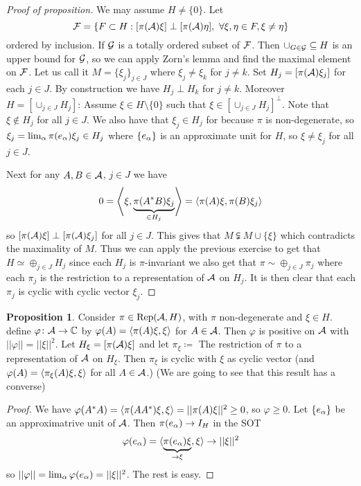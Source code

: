\documentclass[10pt,english,a4paper]{article}
\theoremstyle{definition}
\newtheorem*{proposition}{Proposition}
\DeclareMathOperator{\Rep}{Rep}
\def\vphi{\varphi}
\begin{document}
\begin{proof}[Proof of proposition]
    We may assume $H\neq \{0\}$. Let 
\[ \mathcal{F} = \{ F\subset H : [\pi(\mathcal{A})\xi] \perp [\pi(\mathcal{A})\eta], ~\forall \xi,\eta \in F, \xi\neq \eta\} \]
ordered by inclusion. If $\mathcal{G}$ is a totally ordered subset of $\mathcal{F}$. Then 
$\cup_{G \in \mathcal{G}} \subseteq H$ is an upper bound for $\mathcal{G}$, so we can apply 
Zorn's lemma and find the maximal element on $\mathcal{F}$. Let us call it 
$M  = \{\xi_j\}_{j\in J}$ where $\xi_j\neq \xi_k$ for $j\neq k$. Set
$H_j =[\pi(\mathcal{A})\xi_j]$ for each $j\in J$. By construction we have 
$H_j \perp H_k$ for $j\neq k$. Moreover 
$H = [\cup_{j\in J}H_j]$: Assume $\xi \in H\setminus \{0\}$ such that 
$\xi \in [\cup_{j\in J}H_j]^{\perp}$. Note that $\xi \not\in H_j$ for all $j\in J$.
We also have that $\xi_j \in H_j$ for because $\pi$ is non-degenerate, so 
$\xi_j = \lim_{\alpha}\pi(e_{\alpha})\xi_j \in H_j$ where $\{e_{\alpha}\}$ is an approximate
unit for $H$, so $\xi\neq \xi_j$ for all $j\in J$.

Next for any $A,B \in \mathcal{A}$, $j\in J$ we have \[ 0 =
\left\langle \xi,\underbrace{\pi(A^*B)\xi_j}_{\in H_j} \right\rangle = \left\langle \pi(A)\xi,\pi(B)\xi_j \right\rangle  \] so
$[\pi(\mathcal{A})\xi]\perp [\pi(\mathcal{A})\xi_j]$ for all $j\in J$. This gives that $M
\subsetneqq M \cup \{\xi\}$ which contradicts the maximality of $M$. Thus we
can apply the previous exercise to get that $H \simeq \oplus_{j\in J} H_j$
since each $H_j$ is $\pi$-invariant we also get that $\pi\sim \oplus_{j\in J}
\pi_j$ where each $\pi_j$ is the restriction to a representation of $\mathcal{A}$ on
$H_j$. It is then clear that each $\pi_j$ is cyclic with cyclic vector $\xi_j$.
\end{proof}

\begin{proposition}
    Consider $\pi \in \Rep(\As,H)$, with $\pi$ non-degenerate and $\xi \in H$.
define $\vphi\colon \As \to \C$ by $\vphi(A) = \ind{\pi(A)\xi,\xi}$ for $A\in
\mathcal{A}$. Then $\vphi$ is  positive on $\mathcal{A}$ with 
$||\vphi|| = ||\xi||^2$. Let $H_{\xi} = [\pi(\mathcal{A})\xi]$ and let 
$\pi_{\xi} \coloneqq $ The restriction of $\pi$ to a representation of $\mathcal{A}$ on 
$H_{\xi}$. Then $\pi_{\xi}$ is cyclic with $\xi$ as cyclic vector 
(and $\vphi(A) = \ind{\pi_{\xi}(A)\xi,\xi} $ for all $A \in \mathcal{A}$.)
(We are going to see that this result has a converse)
\end{proposition}
\begin{proof}
   We have 
$\vphi(A^*A) = \ind{\pi(AA^*)\xi,\xi} = ||\pi(A)\xi||^2 \geq 0$, so $\vphi\geq 0$.
Let $\{e_{\alpha}\}$ be an approximatrive unit of $\mathcal{A}$. Then 
$\pi(e_{\alpha}) \to I_{H}$ in the SOT
\begin{align*}
    \vphi(e_{\al}) = \indi{\ub{\pi(e_{\al})\xi}_{\to\xi},\xi}\to ||\xi||^2
\end{align*}
so $||\vphi|| = \lim_{\al}\vphi(e_{\al}) = ||\xi||^2$. The rest is easy. 
\end{proof}
\end{document}
